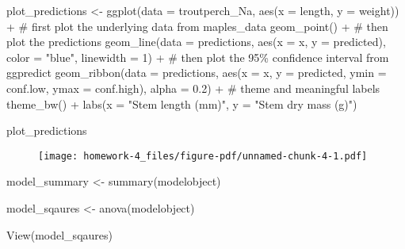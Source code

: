 \documentclass[
  letterpaper,
  DIV=11,
  numbers=noendperiod]{scrartcl}
\newenvironment{Shaded}{\begin{snugshade}}{\end{snugshade}}
\newcommand{\AttributeTok}[1]{\textcolor[rgb]{0.40,0.45,0.13}{#1}}
\newcommand{\CommentTok}[1]{\textcolor[rgb]{0.37,0.37,0.37}{#1}}
\newcommand{\DecValTok}[1]{\textcolor[rgb]{0.68,0.00,0.00}{#1}}
\newcommand{\FloatTok}[1]{\textcolor[rgb]{0.68,0.00,0.00}{#1}}
\newcommand{\FunctionTok}[1]{\textcolor[rgb]{0.28,0.35,0.67}{#1}}
\newcommand{\NormalTok}[1]{\textcolor[rgb]{0.00,0.23,0.31}{#1}}
\newcommand{\OtherTok}[1]{\textcolor[rgb]{0.00,0.23,0.31}{#1}}
\newcommand{\SpecialCharTok}[1]{\textcolor[rgb]{0.37,0.37,0.37}{#1}}
\newcommand{\StringTok}[1]{\textcolor[rgb]{0.13,0.47,0.30}{#1}}
\begin{document}
\begin{Shaded}
\begin{Highlighting}[]
\NormalTok{plot\_predictions }\OtherTok{\textless{}{-}} \FunctionTok{ggplot}\NormalTok{(}\AttributeTok{data =}\NormalTok{ troutperch\_Na, }
                           \FunctionTok{aes}\NormalTok{(}\AttributeTok{x =}\NormalTok{ length, }\AttributeTok{y =}\NormalTok{ weight)) }\SpecialCharTok{+}
  \CommentTok{\# first plot the underlying data from maples\_data}
  \FunctionTok{geom\_point}\NormalTok{() }\SpecialCharTok{+}
  \CommentTok{\# then plot the predictions}
  \FunctionTok{geom\_line}\NormalTok{(}\AttributeTok{data =}\NormalTok{ predictions, }
            \FunctionTok{aes}\NormalTok{(}\AttributeTok{x =}\NormalTok{ x, }\AttributeTok{y =}\NormalTok{ predicted), }
            \AttributeTok{color =} \StringTok{"blue"}\NormalTok{, }\AttributeTok{linewidth =} \DecValTok{1}\NormalTok{) }\SpecialCharTok{+}
  \CommentTok{\# then plot the 95\% confidence interval from ggpredict}
  \FunctionTok{geom\_ribbon}\NormalTok{(}\AttributeTok{data =}\NormalTok{ predictions, }
              \FunctionTok{aes}\NormalTok{(}\AttributeTok{x =}\NormalTok{ x, }\AttributeTok{y =}\NormalTok{ predicted, }\AttributeTok{ymin =}\NormalTok{ conf.low, }\AttributeTok{ymax =}\NormalTok{ conf.high), }
              \AttributeTok{alpha =} \FloatTok{0.2}\NormalTok{) }\SpecialCharTok{+}
  \CommentTok{\# theme and meaningful labels}
  \FunctionTok{theme\_bw}\NormalTok{() }\SpecialCharTok{+}
 \FunctionTok{labs}\NormalTok{(}\AttributeTok{x =} \StringTok{"Stem length (mm)"}\NormalTok{,}
       \AttributeTok{y =} \StringTok{"Stem dry mass (g)"}\NormalTok{)}

\NormalTok{plot\_predictions}
\end{Highlighting}
\end{Shaded}

\begin{figure}[H]

{\centering \texttt{[image: homework-4\_files/figure-pdf/unnamed-chunk-4-1.pdf]}

}

\end{figure}

\begin{Shaded}
\begin{Highlighting}[]
\NormalTok{model\_summary }\OtherTok{\textless{}{-}} \FunctionTok{summary}\NormalTok{(modelobject)}

\NormalTok{model\_sqaures }\OtherTok{\textless{}{-}} \FunctionTok{anova}\NormalTok{(modelobject)}

\FunctionTok{View}\NormalTok{(model\_sqaures)}
\end{Highlighting}
\end{Shaded}
\end{document}
